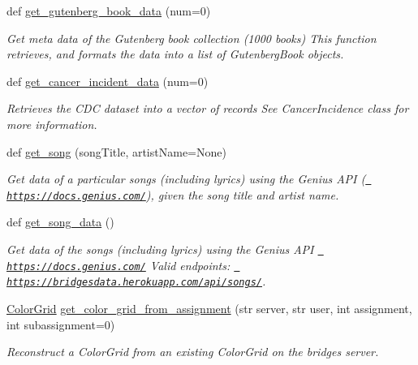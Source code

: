 \begin{DoxyCompactItemize}
def \mbox{\hyperlink{namespacebridges_1_1data__src__dependent_1_1data__source_af377da50c8f4e488b832978908274089}{get\+\_\+gutenberg\+\_\+book\+\_\+data}} (num=0)
\begin{DoxyCompactList}\small\item\em Get meta data of the Gutenberg book collection (1000 books) This function retrieves, and formats the data into a list of Gutenberg\+Book objects. \end{DoxyCompactList}\item 
def \mbox{\hyperlink{namespacebridges_1_1data__src__dependent_1_1data__source_ac711dee7446daedd503ce0f091a5f85e}{get\+\_\+cancer\+\_\+incident\+\_\+data}} (num=0)
\begin{DoxyCompactList}\small\item\em Retrieves the C\+DC dataset into a vector of records See Cancer\+Incidence class for more information. \end{DoxyCompactList}\item 
def \mbox{\hyperlink{namespacebridges_1_1data__src__dependent_1_1data__source_a060ab8ec1777a5458a37d5e01e594e82}{get\+\_\+song}} (song\+Title, artist\+Name=None)
\begin{DoxyCompactList}\small\item\em Get data of a particular songs (including lyrics) using the Genius A\+PI (\href{https://docs.genius.com/}{\texttt{ https\+://docs.\+genius.\+com/}}), given the song title and artist name. \end{DoxyCompactList}\item 
def \mbox{\hyperlink{namespacebridges_1_1data__src__dependent_1_1data__source_abf7f1f53dc13383fa296cb597e4a7ee0}{get\+\_\+song\+\_\+data}} ()
\begin{DoxyCompactList}\small\item\em Get data of the songs (including lyrics) using the Genius A\+PI \href{https://docs.genius.com/}{\texttt{ https\+://docs.\+genius.\+com/}} Valid endpoints\+: \href{https://bridgesdata.herokuapp.com/api/songs/}{\texttt{ https\+://bridgesdata.\+herokuapp.\+com/api/songs/}}. \end{DoxyCompactList}\item 
\mbox{\hyperlink{classbridges_1_1color__grid_1_1_color_grid}{Color\+Grid}} \mbox{\hyperlink{namespacebridges_1_1data__src__dependent_1_1data__source_a57f25e815efe350687cc774010ad0083}{get\+\_\+color\+\_\+grid\+\_\+from\+\_\+assignment}} (str server, str user, int assignment, int subassignment=0)
\begin{DoxyCompactList}\small\item\em Reconstruct a Color\+Grid from an existing Color\+Grid on the bridges server. \end{DoxyCompactList}\item 

\end{DoxyCompactItemize}
